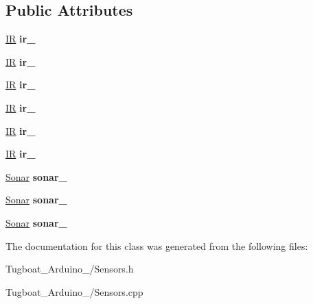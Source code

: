 \subsection*{Public Attributes}
\begin{DoxyCompactItemize}
\item 
\hyperlink{class_i_r}{IR} {\bfseries ir\+\_}\hypertarget{class_sensors_a4e9430961a10cfa8b53d45b5d6e423b9}{}\label{class_sensors_a4e9430961a10cfa8b53d45b5d6e423b9}

\item 
\hyperlink{class_i_r}{IR} {\bfseries ir\+\_}\hypertarget{class_sensors_a89d137051bbb379e0aa894e1351099c1}{}\label{class_sensors_a89d137051bbb379e0aa894e1351099c1}

\item 
\hyperlink{class_i_r}{IR} {\bfseries ir\+\_}\hypertarget{class_sensors_a322ae7684d9f94907ffe47fa165d803e}{}\label{class_sensors_a322ae7684d9f94907ffe47fa165d803e}

\item 
\hyperlink{class_i_r}{IR} {\bfseries ir\+\_}\hypertarget{class_sensors_a66e20e4852b97471172a7b0ca3f6f405}{}\label{class_sensors_a66e20e4852b97471172a7b0ca3f6f405}

\item 
\hyperlink{class_i_r}{IR} {\bfseries ir\+\_}\hypertarget{class_sensors_a2fe7b2079eb3bdbbc29e39320a04297f}{}\label{class_sensors_a2fe7b2079eb3bdbbc29e39320a04297f}

\item 
\hyperlink{class_i_r}{IR} {\bfseries ir\+\_}\hypertarget{class_sensors_a3f6bcc1e415b89d344d5ea8c15344c58}{}\label{class_sensors_a3f6bcc1e415b89d344d5ea8c15344c58}

\item 
\hyperlink{class_sonar}{Sonar} {\bfseries sonar\+\_}\hypertarget{class_sensors_ae7200ec3d56e36b840c64835de1f4c64}{}\label{class_sensors_ae7200ec3d56e36b840c64835de1f4c64}

\item 
\hyperlink{class_sonar}{Sonar} {\bfseries sonar\+\_}\hypertarget{class_sensors_a91eac54f48411a5fcd668da4cf4d19b0}{}\label{class_sensors_a91eac54f48411a5fcd668da4cf4d19b0}

\item 
\hyperlink{class_sonar}{Sonar} {\bfseries sonar\+\_}\hypertarget{class_sensors_a321d2a00942ee2167f9bdae06609d190}{}\label{class_sensors_a321d2a00942ee2167f9bdae06609d190}

\end{DoxyCompactItemize}


The documentation for this class was generated from the following files\+:\begin{DoxyCompactItemize}
\item 
Tugboat\+\_\+\+Arduino\+\_/Sensors.\+h\item 
Tugboat\+\_\+\+Arduino\+\_/Sensors.\+cpp\end{DoxyCompactItemize}
